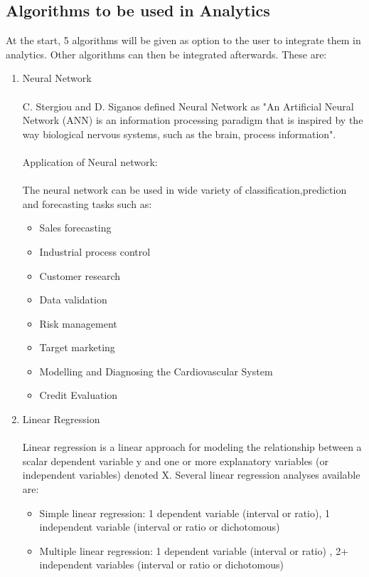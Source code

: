 \documentclass[a4paper,12pt]{report}
\begin{document}
    \subsection{Algorithms to be used in Analytics}
    At the start, 5 algorithms will be given as option to the user to integrate them in analytics. Other algorithms can then be integrated afterwards. These are:
    \begin{enumerate}
    	\item Neural Network\\ \\
    	C. Stergiou and D. Siganos \cite{nano8} defined Neural Network as "An Artificial Neural Network (ANN) is an information processing paradigm that is inspired by the way biological nervous systems, such as the brain, process information". \\
    	\\
    	Application of Neural network:\\ \\
    	The neural network can be used in wide variety of classification,prediction and forecasting tasks such as:
    	\begin{itemize}
    		\item Sales forecasting
    		\item Industrial process control
    		\item Customer research
    		\item Data validation
    		\item Risk management
    		\item Target marketing
    		\item Modelling and Diagnosing the Cardiovascular System
    		\item Credit Evaluation      
    	\end{itemize}
    	\item Linear Regression\\ \\
    	Linear regression is a linear approach for modeling the relationship between a scalar dependent variable y and one or more explanatory variables (or independent variables) denoted X. Several linear regression analyses available are:
    	\begin{itemize}
    		\item Simple linear regression:
    		1 dependent variable (interval or ratio), 1 independent variable (interval or ratio or dichotomous)
    		\item Multiple linear regression:
    		1 dependent variable (interval or ratio) , 2+ independent variables (interval or ratio or dichotomous)

\end{itemize}
\end{enumerate}
\end{document}
